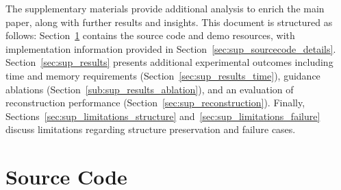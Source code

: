 \clearpage
\setcounter{page}{1}
\maketitlesupplementary




The supplementary materials provide additional analysis to enrich the main paper, along with further results and insights. This document is structured as follows: Section~\ref{sec:sup_sourcecode} contains the source code and demo resources, with implementation information provided in Section~\ref{sec:sup_sourcecode_details}. Section~\ref{sec:sup_results} presents additional experimental outcomes including time and memory requirements (Section~\ref{sec:sup_results_time}), guidance ablations (Section~\ref{sub:sup_results_ablation}), and an evaluation of reconstruction performance (Section~\ref{sec:sup_reconstruction}). Finally, Sections~\ref{sec:sup_limitations_structure} and~\ref{sec:sup_limitations_failure} discuss limitations regarding structure preservation and failure cases.









\section{Source Code}
\label{sec:sup_sourcecode}

